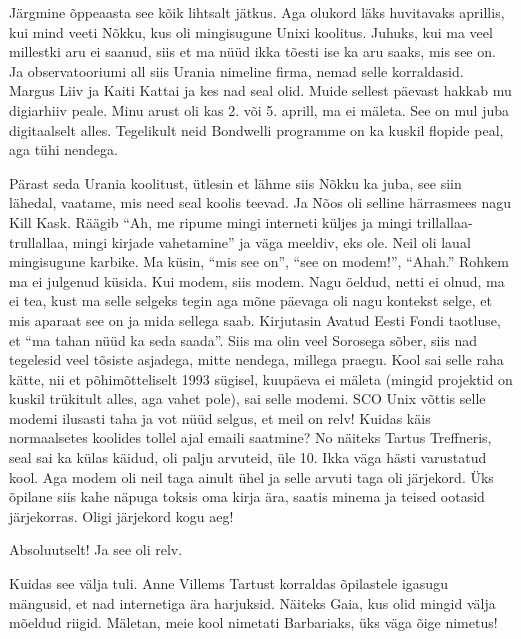 Järgmine õppeaasta see kõik lihtsalt jätkus. Aga olukord läks huvitavaks aprillis, kui mind veeti Nõkku, kus oli mingisugune Unixi koolitus. Juhuks, kui ma veel millestki aru ei saanud, siis et ma nüüd ikka tõesti ise ka aru saaks, mis see on. Ja observatooriumi all siis Urania nimeline firma, nemad selle korraldasid. Margus Liiv ja  Kaiti Kattai ja kes nad seal olid. Muide sellest päevast hakkab mu digiarhiiv peale.  Minu  arust oli kas 2. või 5. aprill, ma ei mäleta. See on mul juba digitaalselt alles. Tegelikult neid Bondwelli programme on ka kuskil flopide peal, aga tühi nendega. 

Pärast seda Urania  koolitust,  ütlesin et lähme siis Nõkku ka juba, see siin lähedal, vaatame, mis need seal koolis teevad. Ja Nõos oli selline härrasmees nagu Kill Kask. Räägib \enquote{Ah, me ripume mingi interneti küljes ja mingi trillallaa-trullallaa, mingi kirjade vahetamine} ja väga meeldiv, eks ole. Neil oli laual mingisugune karbike. Ma küsin, \enquote{mis see on}, \enquote{see on modem!}, \enquote{Ahah.} Rohkem ma ei julgenud küsida. Kui modem, siis modem. Nagu öeldud, netti ei olnud, ma ei tea, kust ma selle selgeks tegin aga mõne päevaga oli nagu kontekst selge, et mis aparaat see on ja mida sellega saab. Kirjutasin Avatud Eesti Fondi taotluse, et \enquote{ma tahan nüüd ka seda saada}. Siis ma olin veel Sorosega sõber, siis nad tegelesid veel tõsiste asjadega, mitte nendega, millega praegu. Kool sai selle raha kätte, nii et põhimõtteliselt 1993 sügisel, kuupäeva ei mäleta (mingid projektid on kuskil trükitult alles, aga vahet pole), sai selle modemi. SCO Unix võttis selle modemi ilusasti taha ja vot nüüd selgus, et meil on relv! Kuidas käis normaalsetes koolides tollel ajal emaili saatmine? No näiteks Tartus Treffneris, seal sai ka külas käidud,  oli palju arvuteid, üle 10. Ikka väga hästi varustatud kool. Aga modem oli neil taga ainult ühel ja selle arvuti taga oli järjekord. Üks õpilane siis kahe näpuga toksis oma kirja ära, saatis minema ja teised ootasid järjekorras. Oligi järjekord kogu aeg! 


Absoluutselt! Ja see oli relv. 

Kuidas see välja tuli. Anne Villems Tartust korraldas õpilastele igasugu mängusid, et nad internetiga  ära harjuksid. Näiteks Gaia, kus olid mingid välja mõeldud riigid. Mäletan, meie kool nimetati Barbariaks, üks väga õige nimetus! 

